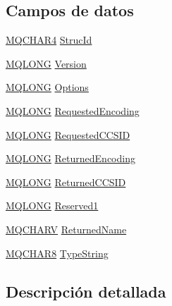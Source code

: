 \subsection*{Campos de datos}
\begin{DoxyCompactItemize}
\item 
\hyperlink{cmqc_8h_a12590e546ed66fda7cf21c1d5cefa31d}{M\+Q\+C\+H\+A\+R4} \hyperlink{structtag_m_q_i_m_p_o_a0530922ca944569b52601d74941f96e4}{Struc\+Id}
\item 
\hyperlink{cmqc_8h_a1fb8d28cbda3fa8766a9821230cdb6d5}{M\+Q\+L\+O\+N\+G} \hyperlink{structtag_m_q_i_m_p_o_a0656ef8f766b3907d394d88a35d7b7e9}{Version}
\item 
\hyperlink{cmqc_8h_a1fb8d28cbda3fa8766a9821230cdb6d5}{M\+Q\+L\+O\+N\+G} \hyperlink{structtag_m_q_i_m_p_o_ad7aff2d6c6044809464380998d24ec5c}{Options}
\item 
\hyperlink{cmqc_8h_a1fb8d28cbda3fa8766a9821230cdb6d5}{M\+Q\+L\+O\+N\+G} \hyperlink{structtag_m_q_i_m_p_o_a3e0b97e59d454d52f8192b1f3924ffb2}{Requested\+Encoding}
\item 
\hyperlink{cmqc_8h_a1fb8d28cbda3fa8766a9821230cdb6d5}{M\+Q\+L\+O\+N\+G} \hyperlink{structtag_m_q_i_m_p_o_aeae366c610d7d1de844e33938f66209e}{Requested\+C\+C\+S\+I\+D}
\item 
\hyperlink{cmqc_8h_a1fb8d28cbda3fa8766a9821230cdb6d5}{M\+Q\+L\+O\+N\+G} \hyperlink{structtag_m_q_i_m_p_o_a6d25b830b8da987b7036e612b63cc493}{Returned\+Encoding}
\item 
\hyperlink{cmqc_8h_a1fb8d28cbda3fa8766a9821230cdb6d5}{M\+Q\+L\+O\+N\+G} \hyperlink{structtag_m_q_i_m_p_o_a1b119a33db820271cc96e8c9bb903878}{Returned\+C\+C\+S\+I\+D}
\item 
\hyperlink{cmqc_8h_a1fb8d28cbda3fa8766a9821230cdb6d5}{M\+Q\+L\+O\+N\+G} \hyperlink{structtag_m_q_i_m_p_o_a4559672a5bdaff57eb82aa03d163ed47}{Reserved1}
\item 
\hyperlink{cmqc_8h_a2a61029e155515c1360dfc809dab6747}{M\+Q\+C\+H\+A\+R\+V} \hyperlink{structtag_m_q_i_m_p_o_ac8906d395aadf10bc120ea24a3dab637}{Returned\+Name}
\item 
\hyperlink{cmqc_8h_abddcedb8c41fa262f2bd05dfec3e60a5}{M\+Q\+C\+H\+A\+R8} \hyperlink{structtag_m_q_i_m_p_o_a191c43a197f69fa0bdd2d9335960f6b0}{Type\+String}
\end{DoxyCompactItemize}


\subsection{Descripción detallada}


